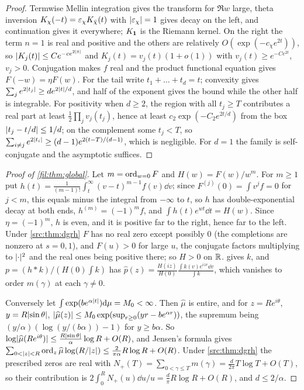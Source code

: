\begin{proof}
Termwise Mellin integration gives the transform for $\Re w$ large, theta inversion
$K_\chi(-t)=\varepsilon_\chi K_{\bar\chi}(t)$ with $\lvert\varepsilon_\chi\rvert=1$ gives decay on the left, and continuation gives it
everywhere; $K_{\mathbf{1}}$ is the Riemann kernel. On the right the term $n=1$ is real and positive and the others are
relatively $O(\exp(-c_\chi e^{2t}))$, so $\lvert K_j(t)\rvert\le Ce^{-ce^{2\lvert t\rvert}}$ and $K_j(t)=v_j(t)(1+o(1))$ with
$v_j(t)\ge e^{-Ce^{2t}}$, $v_j>0$. Conjugation makes $f$ real and the product functional equation gives
$F(-w)=\eta F(w)$. For the tail write $t_1+\dots+t_d=t$; convexity gives $\sum_je^{2\lvert t_j\rvert}\ge de^{2\lvert t\rvert/d}$, and
half of the exponent gives the bound while the other half is integrable. For positivity when $d\ge2$, the region
with all $t_j\ge T$ contributes a real part at least $\tfrac12\prod_jv_j(t_j)$, hence at least
$c_2\exp(-C_2e^{2t/d})$ from the box $\lvert t_j-t/d\rvert\le1/d$; on the complement some $t_j<T$, so
$\sum_{i\ne j}e^{2\lvert t_i\rvert}\ge(d-1)e^{2(t-T)/(d-1)}$, which is negligible. For $d=1$ the family is
self-conjugate and the asymptotic suffices.
\end{proof}

\begin{proof}[Proof of \cref{fil:thm:global}]
Let $m=\operatorname{ord}_{w=0}F$ and $H(w)=F(w)/w^m$. For $m\ge1$ put $h(t)=\frac1{(m-1)!}\int_t^\infty(v-t)^{m-1}f(v)\dd v$;
since $F^{(j)}(0)=\int v^jf=0$ for $j<m$, this equals minus the integral from $-\infty$ to $t$, so $h$ has
double-exponential decay at both ends, $h^{(m)}=(-1)^mf$, and $\int h(t)e^{wt}\dd t=H(w)$. Since
$\eta=(-1)^m$, $h$ is even, and it is positive far to the right, hence far to the left. Under
\cref{src:thm:dgrh} $F$ has no real zero except possibly $0$ (the completions are nonzero at $s=0,1$), and
$F(u)>0$ for large $u$, the conjugate factors multiplying to $\lvert\cdot\rvert^2$ and the real ones being positive there;
so $H>0$ on $\mathbb{R}$.  gives $k$, and $p=(h*k)/(H(0)\int k)$ has
$\widehat p(z)=\frac{H(iz)}{H(0)}\frac{\int k(v)e^{izv}\dd v}{\int k}$, which vanishes to order $m(\gamma)$ at each
$\gamma\ne0$.

Conversely let $\int\exp(be^{\alpha\lvert t\rvert})\mathrm{d}\mu=M_0<\infty$. Then $\widehat\mu$ is entire, and for $z=Re^{i\theta}$,
$y=R\lvert\sin\theta\rvert$, $\lvert\widehat\mu(z)\rvert\le M_0\exp(\sup_{r\ge0}(yr-be^{\alpha r}))$, the supremum being
$(y/\alpha)(\log(y/(b\alpha))-1)$ for $y\ge b\alpha$. So $\log\lvert\widehat\mu(Re^{i\theta})\rvert\le\frac{R\lvert\sin\theta\rvert}\alpha\log R+O(R)$,
and Jensen's formula gives $\sum_{0<\lvert z\rvert<R}\operatorname{ord}_z\widehat\mu\log(R/\lvert z\rvert)\le\frac2{\pi\alpha}R\log R+O(R)$. Under
\cref{src:thm:dgrh} the prescribed zeros are real with $N_+(T)=\sum_{0<\gamma\le T}m(\gamma)=\frac d{2\pi}T\log T+O(T)$,
so their contribution is $2\int_0^RN_+(u)\dd u/u=\frac d\pi R\log R+O(R)$, and $d\le2/\alpha$.
\end{proof}

